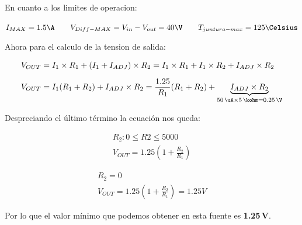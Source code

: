 \documentclass[chaptersright]{informeutn}
\begin{document}
        En cuanto a los limites de operacion:

        \begin{center}
          $I_{MAX}=1.5\A \qquad V_{Diff-MAX}=V_{in}-V_{out}=40\V \qquad T_{juntura-max}=125\Celsius$
        \end{center}

        Ahora para el calculo de la tension de salida:

        \begin{align*}
          V_{OUT} &= I_1 \times R_1 + \left(I_1 + I_{ADJ}\right) \times R_2
          = I_1 \times R_1 + I_1 \times R_2 + I_{ADJ} \times R_2 \\[6pt]
          V_{OUT} &= I_1 (R_1 + R_2) + I_{ADJ} \times R_2
          = \frac{1.25}{R_1} (R_1 + R_2) + \underbrace{I_{ADJ} \times R_2}_{50\,\uA \times 5\,\kohm = 0.25\,\V}
        \end{align*}

        Despreciando el último término la ecuación nos queda:

        \begin{figure}[H]
          \centering
          \begin{minipage}{0.4\textwidth}
            \begin{gather*}
              R_2: 0 \leq R2 \leq 5000\\
              V_{OUT} = 1.25 \left(1 + \frac{R_2}{R_1}\right)
            \end{gather*}
          \end{minipage}
          \hspace{1cm}
          \begin{minipage}{0.4\textwidth}
            \begin{gather*}
              R_2 = 0\\
              V_{OUT} = 1.25 \left(1 + \frac{R_2}{R_1}\right) = 1.25V
            \end{gather*}
          \end{minipage}
        \end{figure}

        Por lo que el valor mínimo que podemos obtener en esta fuente es \textbf{1.25\,V}.
\end{document}
